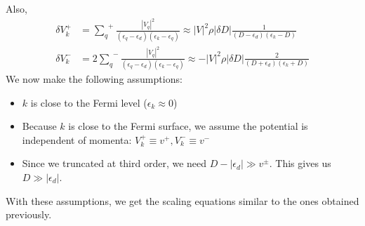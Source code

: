 Also,
\begin{equation}\begin{aligned}
\delta V_k^+ &= {\sum_q}^+ \frac{|V_q|^2}{(\epsilon_q - \epsilon_d)(\epsilon_k - \epsilon_q)} \approx |V|^2 \rho |\delta D|\frac{1}{(D - \epsilon_d)(\epsilon_k - D)}\\
\delta V_k^- &= 2{\sum_q}^- \frac{|V_q|^2}{(\epsilon_q - \epsilon_d)(\epsilon_k - \epsilon_q)} \approx -|V|^2 \rho |\delta D|\frac{2}{(D + \epsilon_d)(\epsilon_k + D)}
\end{aligned}\end{equation}
We now make the following assumptions:
\begin{itemize}
	\item \(k\) is close to the Fermi level (\(\epsilon_k \approx 0\))
	\item Because \(k\) is close to the Fermi surface, we assume the potential is independent of momenta: \(V_k^+ \equiv v^+, V^-_k \equiv v^-\)
	\item Since we truncated at third order, we need \(D - |\epsilon_d| \gg v^\pm\).
		This gives us \(D \gg |\epsilon_d|\).
\end{itemize}
With these assumptions, we get the scaling equations similar to the ones obtained previously.
